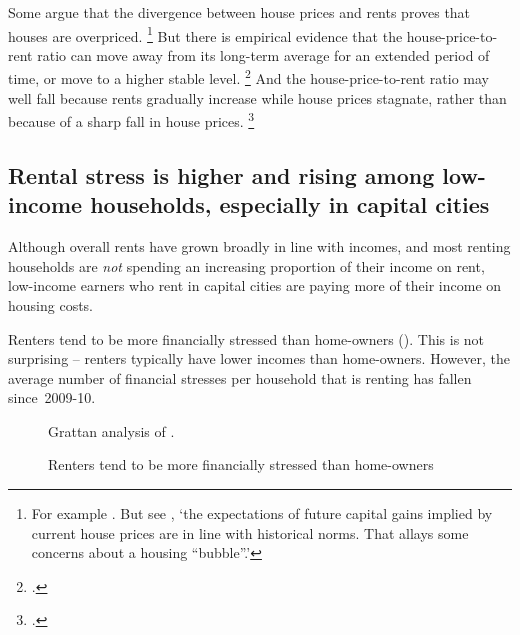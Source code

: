 Some argue that the divergence between house prices and rents proves that houses are overpriced.%
	\footnote{For example \textcites{Soos-2011-bubbling-over}{Janda2014}.
	But see \textcite{FoxTulip2014overvalued}, `the expectations of future capital gains implied by current house prices are in line with historical norms.
	That allays some concerns about a housing ``bubble''.'}
But there is empirical evidence that the house-price-to-rent ratio can move away from its long-term average for an extended period of time, or move to a higher stable level.%
	\footcites{Ambroseetal2013}{Sommeretal-2010}[][11]{2010BirdsEyeView}
And the house-price-to-rent ratio may well fall because rents gradually increase while house prices stagnate, rather than because of a sharp fall in house prices.%
    \footcite{2010BirdsEyeView}

\subsection{Rental stress is higher and rising among low-income households, especially in capital cities }\label{subsec:rental-stress-is-higher-among-low-income-households-especially-in-capital-cities}
Although overall rents have grown broadly in line with incomes, and most renting households are \emph{not} spending an increasing proportion of their income on rent, low-income earners who rent in capital cities are paying more of their income on housing costs.

Renters tend to be more financially stressed than home-owners ().
This is not surprising -- renters typically have lower incomes than home-owners. However, the average number of financial stresses per household that is renting has fallen since~2009-10.

\begin{figure}
\caption{Renters tend to be more financially stressed than home-owners}\label{fig:financial-stresses}
%
{Grattan analysis of \textcite{ABS-HES-201516-Microdata}.}
\end{figure}


